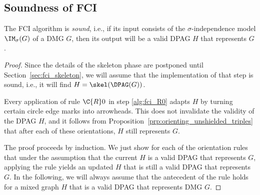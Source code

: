 \subsection{Soundness of FCI}

\begin{Thm}\label{thm:fci_sound}
  The FCI algorithm is \emph{sound}, i.e., if its input consists of the $\sigma$-independence model $\IM_\sigma(G)$ of a DMG $G$, then its output will be a valid DPAG $H$ that represents $G$.
\end{Thm}
\begin{proof}
  Since the details of the skeleton phase are postponed until Section~\ref{sec:fci_skeleton}, we will assume that the implementation of that step is sound, i.e., it will find $H = \skel(\DPAG(G))$.

  Every application of rule $\C{R}0$ in step \ref{alg:fci_R0} adapts $H$ by turning certain circle edge marks into arrowheads.
  This does not invalidate the validity of the DPAG $H$, and it follows from Proposition~\ref{prp:orienting_unshielded_triples} that after each of these orientations, $H$ still represents $G$.

  The proof proceeds by induction.
  We just show for each of the orientation rules that under the assumption that the current $H$ is a valid DPAG that represents $G$, applying the rule yields an updated $H$ that is still a valid DPAG that represents $G$.
  In the following, we will always assume that the antecedent of the rule holds for a mixed graph $H$ that is a valid DPAG that represents DMG $G$.


\end{proof}
